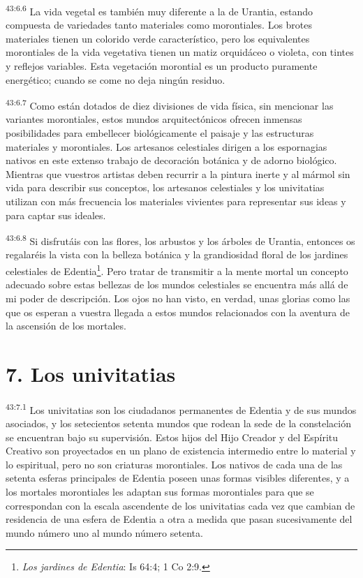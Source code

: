 \par
\textsuperscript{43:6.6} La vida vegetal es también muy diferente a la de Urantia, estando compuesta de variedades tanto materiales como morontiales. Los brotes materiales tienen un colorido verde característico, pero los equivalentes morontiales de la vida vegetativa tienen un matiz orquidáceo o violeta, con tintes y reflejos variables. Esta vegetación morontial es un producto puramente energético; cuando se come no deja ningún residuo.

\par
\textsuperscript{43:6.7} Como están dotados de diez divisiones de vida física, sin mencionar las variantes morontiales, estos mundos arquitectónicos ofrecen inmensas posibilidades para embellecer biológicamente el paisaje y las estructuras materiales y morontiales. Los artesanos celestiales dirigen a los espornagias nativos en este extenso trabajo de decoración botánica y de adorno biológico. Mientras que vuestros artistas deben recurrir a la pintura inerte y al mármol sin vida para describir sus conceptos, los artesanos celestiales y los univitatias utilizan con más frecuencia los materiales vivientes para representar sus ideas y para captar sus ideales.

\par
\textsuperscript{43:6.8} Si disfrutáis con las flores, los arbustos y los árboles de Urantia, entonces os regalaréis la vista con la belleza botánica y la grandiosidad floral de los jardines celestiales de Edentia\footnote{\textit{Los jardines de Edentia}: Is 64:4; 1 Co 2:9.}. Pero tratar de transmitir a la mente mortal un concepto adecuado sobre estas bellezas de los mundos celestiales se encuentra más allá de mi poder de descripción. Los ojos no han visto, en verdad, unas glorias como las que os esperan a vuestra llegada a estos mundos relacionados con la aventura de la ascensión de los mortales.

\section*{7. Los univitatias}
\par
\textsuperscript{43:7.1} Los univitatias son los ciudadanos permanentes de Edentia y de sus mundos asociados, y los setecientos setenta mundos que rodean la sede de la constelación se encuentran bajo su supervisión. Estos hijos del Hijo Creador y del Espíritu Creativo son proyectados en un plano de existencia intermedio entre lo material y lo espiritual, pero no son criaturas morontiales. Los nativos de cada una de las setenta esferas principales de Edentia poseen unas formas visibles diferentes, y a los mortales morontiales les adaptan sus formas morontiales para que se correspondan con la escala ascendente de los univitatias cada vez que cambian de residencia de una esfera de Edentia a otra a medida que pasan sucesivamente del mundo número uno al mundo número setenta.

